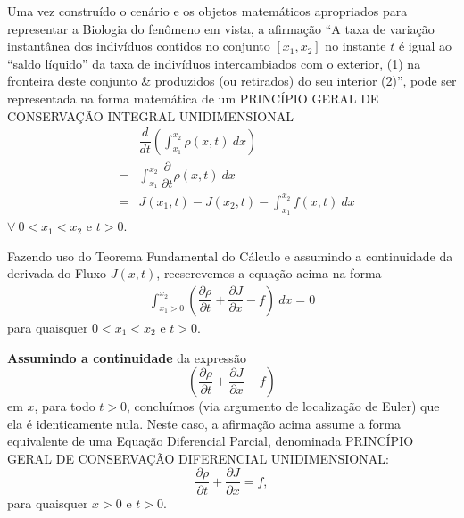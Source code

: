 Uma vez construído o cenário e os objetos matemáticos apropriados para representar a Biologia do fenômeno em vista, a afirmação ``A taxa de variação instantânea dos indivíduos contidos no conjunto \([x_1, x_2]\) no instante \(t\) é igual ao ``saldo líquido'' da taxa de indivíduos intercambiados com o exterior, (1) na fronteira deste conjunto \& produzidos (ou retirados) do seu interior (2)'', pode ser representada na forma matemática de um PRINCÍPIO GERAL DE CONSERVAÇÃO INTEGRAL UNIDIMENSIONAL
\[\begin{array}{rcl}
& & \dfrac{d}{dt}\left(\displaystyle\int_{x_1}^{x_2} \rho(x,t)\ dx\right) \\[0.5cm]
&=&
\displaystyle\int_{x_1}^{x_2} \dfrac{\partial}{\partial t}\rho(x,t)\ dx \\[0.5cm]
&=&
J(x_1,t) - J(x_2,t) - \displaystyle\int_{x_1}^{x_2} f(x,t)\ dx
\end{array}\]
\(\forall\ 0 < x_1 < x_2\) e \(t > 0\).



Fazendo uso do Teorema Fundamental do Cálculo e assumindo a continuidade da derivada do Fluxo \(J(x,t)\), reescrevemos a equação acima na forma
\[\begin{array}{rcl}
\displaystyle\int_{x_1>0}^{x_2} \left(\dfrac{\partial \rho}{\partial t} + \dfrac{\partial J}{\partial x} - f\right)\ dx = 0
\end{array}\]
para quaisquer \(0 < x_1 < x_2\) e \(t > 0\).

\textbf{Assumindo a continuidade} da expressão
\[\left(\dfrac{\partial \rho}{\partial t} + \dfrac{\partial J}{\partial x} - f\right)\]
em \(x\), para todo \(t > 0\), concluímos (via argumento de localização de Euler) que ela é identicamente nula. Neste caso, a afirmação acima assume a forma equivalente de uma Equação Diferencial Parcial, denominada PRINCÍPIO GERAL DE CONSERVAÇÃO DIFERENCIAL UNIDIMENSIONAL:
\[\dfrac{\partial \rho}{\partial t} + \dfrac{\partial J}{\partial x} = f,\]
para quaisquer \(x > 0\) e \(t > 0\).

